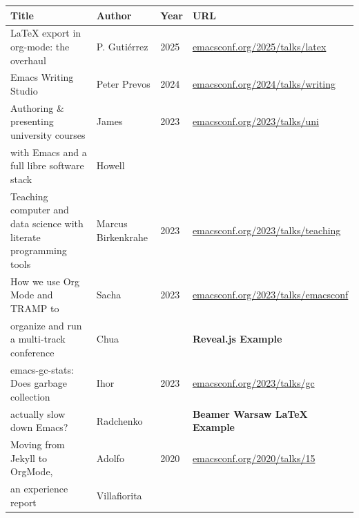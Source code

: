 \begin{whenOrg}
\begin{verblatex}
\begin{frame}[fragile,plain,label=priorArt]
\begin{tabular}{|p{2.5in}|p{0.75in}|p{0.3in}|p{1.5in}|}
  \hline
  \textbf{Title} & \textbf{Author} & \textbf{Year} & \textbf{URL} \\
  \hline
  \small LaTeX export in org-mode: the overhaul  & \small P. Gutiérrez & \small 2025 & \tiny\url{emacsconf.org/2025/talks/latex} \\
  \hline
  \small Emacs Writing Studio & \small Peter Prevos & \small 2024 & \tiny\url{emacsconf.org/2024/talks/writing} \\
  \hline
  \small Authoring \& presenting university courses & \small James & \small 2023 & \tiny\url{emacsconf.org/2023/talks/uni} \\
  \small with Emacs and a full libre software stack & \small Howell &  &  \\  
  \hline
  \small Teaching computer and data science with literate programming tools & \small Marcus Birkenkrahe & \small 2023 & \tiny\url{emacsconf.org/2023/talks/teaching} \\
  \hline
  \small {\color{violet} How we use Org Mode and TRAMP to}  & \small Sacha & \small 2023 & \tiny\url{emacsconf.org/2023/talks/emacsconf} \\
  \small {\color{violet} organize and run a multi-track conference} & \small Chua &  & \tiny {\color{violet} \textbf{Reveal.js Example}}\\
  \hline
  \small {\color{teal} emacs-gc-stats: Does garbage collection}  & \small Ihor  & \small 2023 & \tiny\url{emacsconf.org/2023/talks/gc} \\
  \small {\color{teal} actually slow down Emacs?} & \small Radchenko &  & \tiny {\color{teal} \textbf{Beamer Warsaw LaTeX Example}} \\
  \hline
  \small Moving from Jekyll to OrgMode, & \small Adolfo  & \small 2020 & \tiny\url{emacsconf.org/2020/talks/15} \\
  \small an experience report & \small Villafiorita &  & \\
  \hline
\end{tabular}

\end{frame}
\end{verblatex}
\end{whenOrg}
